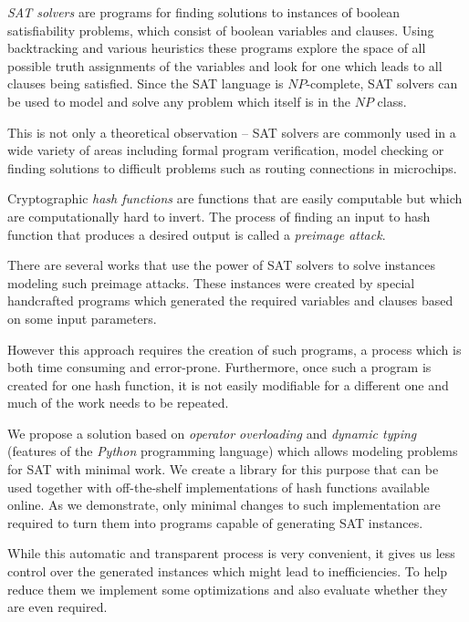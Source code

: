 
\emph{SAT solvers} are programs for finding solutions to instances of boolean satisfiability problems, which consist of boolean variables and clauses.
Using backtracking and various heuristics these programs explore the space of all possible truth assignments of the variables and look for one which leads to all clauses being satisfied.
Since the SAT language is $NP$-complete, SAT solvers can be used to model and solve any problem which itself is in the $NP$ class.

This is not only a theoretical observation -- SAT solvers are commonly used in a wide variety of areas including formal program verification, model checking or finding solutions to difficult problems such as routing connections in microchips.

Cryptographic \emph{hash functions} are functions that are easily computable but which are computationally hard to invert.
The process of finding an input to hash function that produces a desired output is called a \emph{preimage attack}.

There are several works that use the power of SAT solvers to solve instances modeling such preimage attacks.
These instances were created by special handcrafted programs which generated the required variables and clauses based on some input parameters.

However this approach requires the creation of such programs, a process which is both time consuming and error-prone.
Furthermore, once such a program is created for one hash function, it is not easily modifiable for a different one and much of the work needs to be repeated.

We propose a solution based on \emph{operator overloading} and \emph{dynamic typing} (features of the \emph{Python} programming language) which allows modeling problems for SAT with minimal work.
We create a library for this purpose that can be used together with off-the-shelf implementations of hash functions available online.
As we demonstrate, only minimal changes to such implementation are required to turn them into programs capable of generating SAT instances.

While this automatic and transparent process is very convenient, it gives us less control over the generated instances which might lead to inefficiencies.
To help reduce them we implement some optimizations and also evaluate whether they are even required.
